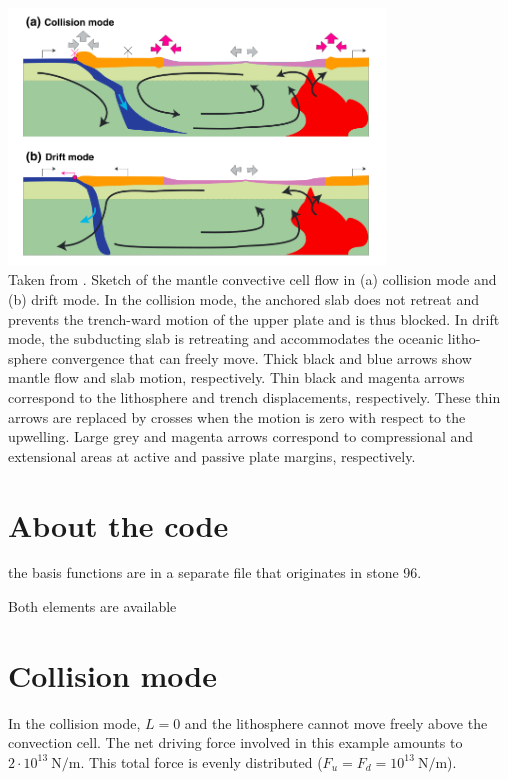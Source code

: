 \begin{center}
\includegraphics[width=10cm]{python_codes/fieldstone_143/images/yahb13_b}\\
{\captionfont 
Taken from \cite{yahb13}. 
Sketch of the mantle convective cell flow in (a) collision mode and (b) drift mode. In the
collision mode, the anchored slab does not retreat and prevents the trench-ward motion of the upper plate
and is thus blocked. In drift mode, the subducting slab is retreating and accommodates the oceanic litho-
sphere convergence that can freely move. Thick black and blue arrows show mantle flow and slab motion,
respectively. Thin black and magenta arrows correspond to the lithosphere and trench displacements,
respectively. These thin arrows are replaced by crosses when the motion is zero with respect to the upwelling.
Large grey and magenta arrows correspond to compressional and extensional areas at active and passive plate
margins, respectively.
}
\end{center}

\section*{About the code}

the basis functions are in a separate file that originates in stone 96.

Both elements are available



\section*{Collision mode}

In the collision mode, $L = 0$ and the lithosphere cannot
move freely above the convection cell. The net driving force involved in this
example amounts to $2\cdot 10^{13}~\si{\newton\per\meter}$. This total force is evenly
distributed ($F_u = F_d = 10^{13}~\si{\newton\per\meter}$). 




